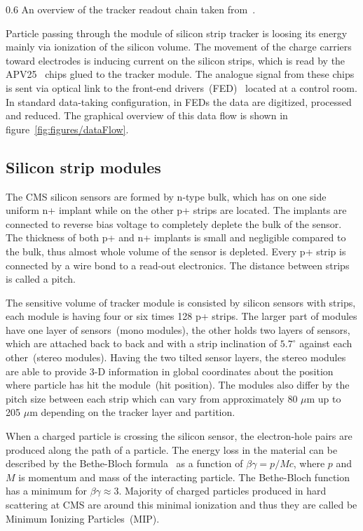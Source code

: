                  {0.6}       %
                 {An overview of the tracker readout chain taken from~\cite{Bainbridge:2004jc}.} %

Particle passing through the module of silicon strip tracker is loosing its energy mainly via ionization of the silicon volume. The movement of the charge carriers toward electrodes is inducing current on the silicon strips, which is read by the APV25~\cite{French:2001xb} chips glued to the tracker module. The analogue signal from these chips is sent via optical link to the front-end drivers~(FED)~\cite{Baird:2002wg} located at a control room. In standard data-taking configuration, in FEDs the data are digitized, processed and reduced. The graphical overview of this data flow is shown in figure~\ref{fig:figures/dataFlow}.

\subsection{Silicon strip modules}

The CMS silicon sensors are formed by n-type bulk, which has on one side uniform n+ implant while on the other p+ strips are located. The implants are connected to reverse bias voltage to completely deplete the bulk of the sensor. The thickness of both p+ and n+ implants is small and negligible compared to the bulk, thus almost whole volume of the sensor is depleted. Every p+ strip is connected by a wire bond to a read-out electronics. The distance between strips is called a pitch.

The sensitive volume of tracker module is consisted by silicon sensors with strips, each module is having four or six times 128 p+ strips. The larger part of modules have one layer of sensors~(mono modules), the other holds two layers of sensors, which are attached back to back and with a strip inclination of $5.7^{\circ}$ against each other~(stereo modules). Having the two tilted sensor layers, the stereo modules are able to provide 3-D information in global coordinates about the position where particle has hit the module~(hit position). The modules also differ by the pitch size between each strip which can vary from approximately 80 $\mu$m up to 205 $\mu$m depending on the tracker layer and partition.

When a charged particle is crossing the silicon sensor, the electron-hole pairs are produced along the path of a particle. The energy loss in the material can be described by the Bethe-Bloch formula~\cite{Groom:2000sm} as a function of $\beta\gamma = p/Mc$, where $p$ and $M$ is momentum and mass of the interacting particle. The Bethe-Bloch function has a minimum for $\beta\gamma \approx 3$. Majority of charged particles produced in hard scattering at CMS are around this minimal ionization and thus they are called be Minimum Ionizing Particles~(MIP).

